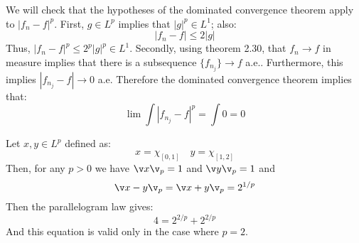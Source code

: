 We will check that the hypotheses of the dominated convergence theorem apply to $| f_n -f|^p$.
First, $g\in L^p$ implies that $|g|^p \in L^1$; also:
$$|f_n -f| \leq 2|g|$$
Thus, $|f_n-f|^p\leq 2^p|g|^p\in L^1$.
Secondly, using theorem 2.30, that $f_n \to f$ in measure implies that there is a subsequence $\{f_{n_j}\}\to f$ a.e.. Furthermore, this implies $|f_{n_j}-f|\to0$ a.e.
Therefore the dominated convergence theorem implies that:
$$\lim\int |f_{n_j}-f|^p = \int 0= 0$$

Let $x,y\in L^p$ defined as:
$$x=\chi_{[0,1]}\quad y = \chi_{[1,2]}$$
Then, for any $p>0$ we have $\v x\v_p=1$ and $\v y \v_p=1$ and 
$$\v x-y\v_p=\v x+y\v_p =2^{1/p}$$
Then the parallelogram law gives:
$$4= 2^{2/p}+2^{2/p}$$
And this equation is valid only in the case where $p=2$.


